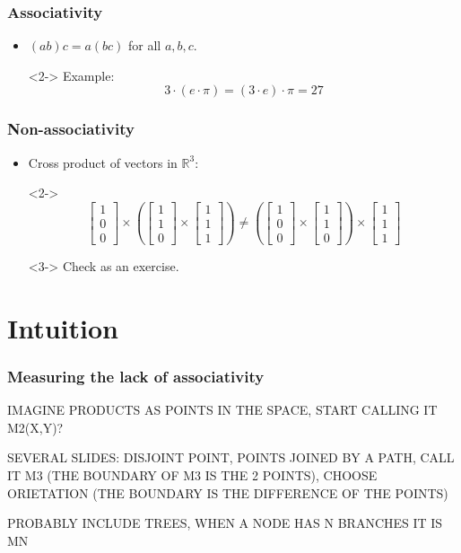 \documentclass{beamer}
\theoremstyle{definition}
\begin{document}
\begin{frame}
\frametitle{Associativity}
\begin{itemize}
\item $(ab)c=a(bc)$ for all $a,b,c$.
\item[]<2-> Example: \[3\cdot (e\cdot \pi) = (3\cdot e)\cdot \pi = 27\]
\end{itemize}
\end{frame}

\begin{frame}
\frametitle{Non-associativity}
\begin{itemize}
\item<1-> Cross product of vectors in $\mathbb{R}^3$:
\item[]<2-> 
\[
 \begin{bmatrix}
1\\
0\\
0
\end{bmatrix}\times\left(\begin{bmatrix}
1\\
1\\
0
\end{bmatrix} \times \begin{bmatrix}
1\\
1\\
1
\end{bmatrix}\right) \neq \left(\begin{bmatrix}
1\\
0\\
0
\end{bmatrix}\times\begin{bmatrix}
1\\
1\\
0
\end{bmatrix}\right)\times\begin{bmatrix}
1\\
1\\
1
\end{bmatrix}
\]
\item[]<3-> Check as an exercise.
\end{itemize}


\end{frame}


\section{Intuition}
\begin{frame}
\frametitle{Measuring the lack of associativity}

IMAGINE PRODUCTS AS POINTS IN THE SPACE, START CALLING IT M2(X,Y)?

SEVERAL SLIDES: DISJOINT POINT, POINTS JOINED BY A PATH, CALL IT M3 (THE BOUNDARY OF M3 IS THE 2 POINTS), CHOOSE ORIETATION (THE BOUNDARY IS THE DIFFERENCE OF THE POINTS)

PROBABLY INCLUDE TREES, WHEN A NODE HAS N BRANCHES IT IS MN
\end{frame}
\end{document}
